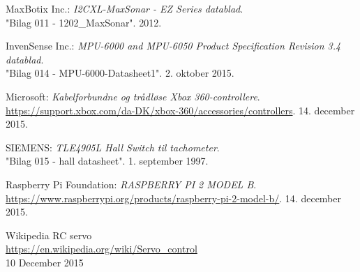\begin{thebibliography}{2}
 MaxBotix Inc.: \textit{I2CXL-MaxSonar - EZ Series datablad}. \\
"Bilag 011 - 1202\_MaxSonar". 2012.

 InvenSense Inc.: \textit{MPU-6000 and MPU-6050 Product Specification Revision 3.4 datablad}. \\
"Bilag 014 - MPU-6000-Datasheet1". 2. oktober 2015.

 Microsoft: \textit{Kabelforbundne og trådløse Xbox 360-controllere}. \\
\url{https://support.xbox.com/da-DK/xbox-360/accessories/controllers}. 14. december 2015.

 SIEMENS: \textit{TLE4905L Hall Switch til tachometer}. \\
"Bilag 015 - hall datasheet". 1. september 1997.

 Raspberry Pi Foundation: \textit{RASPBERRY PI 2 MODEL B}. \\
\url{https://www.raspberrypi.org/products/raspberry-pi-2-model-b/}. 14. december 2015.

 Wikipedia RC servo \\
\url{https://en.wikipedia.org/wiki/Servo_control}\\
10 December 2015

\end{thebibliography}